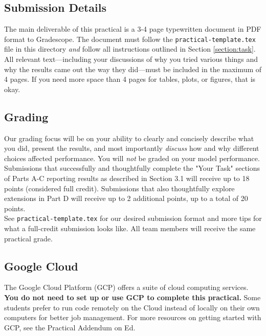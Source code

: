 \documentclass[12pt]{article}
\begin{document}
\subsection{Submission Details}
The main deliverable of this practical is a 3-4 page typewritten document in PDF format to Gradescope.  The document must follow the
\texttt{practical-template.tex} file in this directory \emph{and} follow all instructions outlined in Section \ref{section:task}.  All relevant text---including your discussions of why you tried various things and why the results came out the way they did---must be included in the maximum of 4 pages.  If you need more space than 4 pages for tables, plots, or figures, that is okay.

\subsection{Grading}\label{section:grading}

Our grading focus will be on your ability to clearly and concisely describe what you did, present the results, and most importantly \emph{discuss} how and why different choices affected performance.  You will \emph{not} be graded on your model performance.\\

\noindent Submissions that successfully and thoughtfully complete the "Your Task" sections of Parts A-C reporting results as described in Section 3.1 will receive up to 18 points (considered full credit).  Submissions that also thoughtfully explore extensions in Part D will receive up to 2 additional points, up to a total of 20 points.\\

\noindent See \texttt{practical-template.tex} for our desired submission format and more tips for what a full-credit submission looks like.  All team members will receive the same practical grade.

\subsection{Google Cloud}

The Google Cloud Platform (GCP) offers a suite of cloud computing services.  \textbf{You do not need to set up or use GCP to complete this practical.}  Some students prefer to run code remotely on the Cloud instead of locally on their own computers for better job management. For more resources on getting started with GCP, see the Practical Addendum on Ed.
\end{document}

